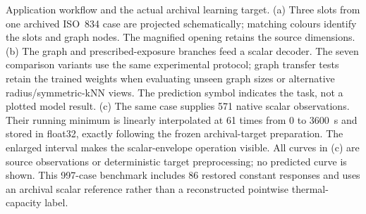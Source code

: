 Application workflow and the actual archival learning target. (a) Three slots from one archived ISO~834 case are projected schematically; matching colours identify the slots and graph nodes. The magnified opening retains the source dimensions. (b) The graph and prescribed-exposure branches feed a scalar decoder. The seven comparison variants use the same experimental protocol; graph transfer tests retain the trained weights when evaluating unseen graph sizes or alternative radius/symmetric-kNN views. The prediction symbol indicates the task, not a plotted model result. (c) The same case supplies 571 native scalar observations. Their running minimum is linearly interpolated at 61 times from 0 to 3600~s and stored in float32, exactly following the frozen archival-target preparation. The enlarged interval makes the scalar-envelope operation visible. All curves in (c) are source observations or deterministic target preprocessing; no predicted curve is shown. This 997-case benchmark includes 86 restored constant responses and uses an archival scalar reference rather than a reconstructed pointwise thermal-capacity label.
